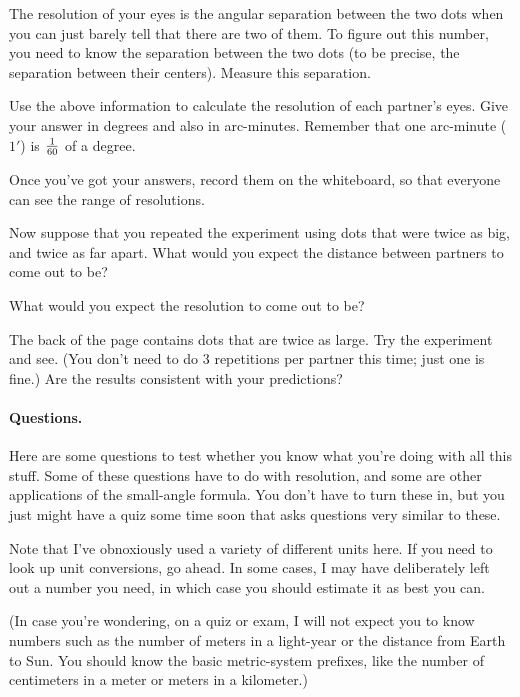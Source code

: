 The resolution of your eyes is the angular separation between the
two dots when you can just barely tell that there are two of them.
To figure out this number, you need to know the 
separation between the two dots (to be precise, the separation between
their centers). Measure this separation.

\vskip 1in

Use the above information to calculate the resolution of each
partner's eyes. Give your answer in degrees and also in
arc-minutes. Remember that one arc-minute ($1'$) is $1\over 60$ of
a degree.

\vskip 2.5in

Once you've got your answers, record them on the whiteboard,
so that everyone can see the range of resolutions.

Now suppose that you repeated the experiment using dots that
were twice as big, and twice as far apart.
What would you expect the distance between partners to come out to be?

\vskip 1in

What would you expect the resolution to come out to be?

\vskip 1in

The back of the page contains dots that are twice as large.
Try the experiment and see. (You don't need to do 3 repetitions per partner
this time; just one is fine.) Are the results consistent with
your predictions?

\vskip 1in

\paragraph{Questions.}

Here are some questions to test whether you know what you're doing
with all this stuff. Some of these questions have to
do with resolution, and some are other applications of
the small-angle formula.
You don't have to turn these in, but 
you just might have a quiz some time soon that asks questions very similar
to these.

Note that I've obnoxiously used a variety of different units here.
If you need to look up unit conversions, go ahead. 
In some cases, I may have deliberately left out a number you need, in which case
you should estimate it as best you can.

(In case you're wondering, on a quiz or exam, I will not expect you to know 
numbers such as the number of meters
in a light-year or the distance from Earth to Sun.
You should know the basic
metric-system prefixes, like the number of centimeters in a meter
or meters in a kilometer.)

